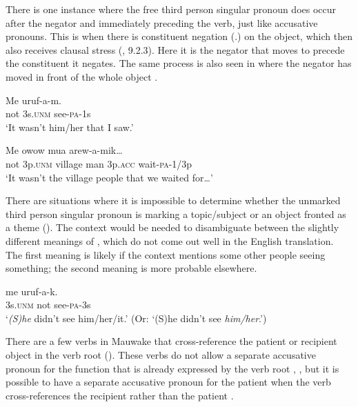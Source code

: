 There is one instance where the free third person singular pronoun does occur after the negator and immediately preceding the verb, just like accusative pronouns. This is when there is constituent negation (.) on the object, which then also receives clausal stress  (, 9.2.3). Here it is the negator that moves to precede the constituent it negates. The same process is also seen in  where the negator has moved in front of the whole object . 

\ea%
\label{ex:3:x561}
\gll Me  uruf-a-m. \\
not 3s.\textsc{unm} see-\textsc{pa}-1s\\
\glt`It wasn't him/her that I saw.'
\z

\ea%
\label{ex:3:x562}
\gll Me  owow mua  arew-a-mik{\dots} \\
not 3p.\textsc{unm} village man 3p.\textsc{acc} wait-\textsc{pa}-1/3p\\
\glt`It wasn't the village people that we waited for{\dots}'
\z

There are situations where it is impossible to determine whether the unmarked third person singular pronoun is marking a topic/subject or an object fronted as a theme (). The context would be needed to disambiguate between the slightly different meanings of , which do not come out well in the English translation. The first meaning is likely if the context mentions some other people seeing something; the second meaning is more probable elsewhere. 

\ea%
\label{ex:3:x563}
\gll {} me uruf-a-k. \\
3s.\textsc{unm} not see-\textsc{pa}-3s\\
\glt`\textit{(S)he} didn't see him/her/it.' (Or: `(S)he didn't see \textit{him/her}.')
\z

There are a few verbs in Mauwake that cross-reference the patient or recipient object in the verb root (). These verbs do not allow a separate accusative pronoun for the function that is already expressed by the verb root , , but it is possible to have a separate accusative pronoun for the patient when the verb cross-references the recipient rather than the patient .

